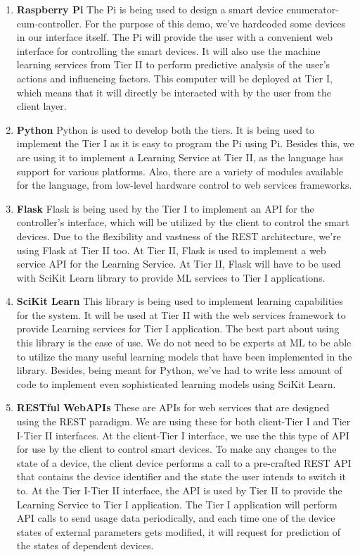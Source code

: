 \begin{enumerate}
\item \textbf{Raspberry Pi} The Pi is being used to design a smart device enumerator-cum-controller. For the purpose of this demo, we've hardcoded some devices in our interface itself. The Pi will provide the user with a convenient web interface for controlling the smart devices. It will also use the machine learning services from Tier II to perform predictive analysis of the user's actions and influencing factors. This computer will be deployed at Tier I, which means that it will directly be interacted with by the user from the client layer.

\item \textbf{Python} Python is used to develop both the tiers. It is being used to implement the Tier I as it is easy to program the Pi using Pi. Besides this, we are using it to implement a Learning Service at Tier II, as the language has support for various platforms. Also, there are a variety of modules available for the language, from low-level hardware control to web services frameworks.

\item \textbf{Flask} Flask is being used by the Tier I to implement an API for the controller's interface, which will be utilized by the client to control the smart devices. Due to the flexibility and vastness of the REST architecture, we're using Flask at Tier II too. At Tier II, Flask is used to implement a web service API for the Learning Service. At Tier II, Flask will have to be used with SciKit Learn library to provide ML services to Tier I applications.

\item \textbf{SciKit Learn} This library is being used to implement learning capabilities for the system. It will be used at Tier II with the web services framework to provide Learning services for Tier I application. The best part about using this library is the ease of use. We do not need to be experts at ML to be able to utilize the many useful learning models that have been implemented in the library. Besides, being meant for Python, we've had to write less amount of code to implement even sophisticated learning models using SciKit Learn.

\item \textbf{RESTful WebAPIs} These are APIs for web services that are designed using the REST paradigm. We are using these for both client-Tier I and Tier I-Tier II interfaces. At the client-Tier I interface, we use the this type of API for use by the client to control smart devices. To make any changes to the state of a device, the client device performs a call to a pre-crafted REST API that contains the device identifier and the state the user intends to switch it to. At the Tier I-Tier II interface, the API is used by Tier II to provide the Learning Service to Tier I application. The Tier I application will perform API calls to send usage data periodically, and each time one of the device states of external parameters gets modified, it will request for prediction of the states of dependent devices.
\end{enumerate}
